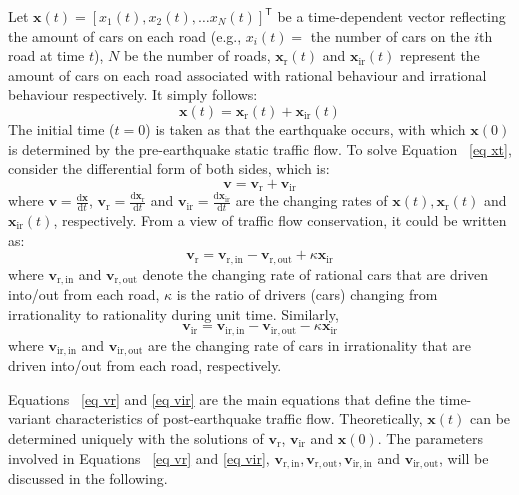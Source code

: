 \documentclass[review,11pt,nonatbib]{elsarticle}
\begin{document}
\par Let $\mathbf{x}(t) = [x_1(t),x_2(t),\ldots x_N(t)]^{\textsf{T}}$ be a time-dependent vector reflecting the amount of cars on each road (e.g., $x_i(t) = $ the number of cars on the $i$th road at time $t$),  $N$ be the number of roads, $\mathbf{x}_{\mathrm{r}}(t)$ and $\mathbf{x}_{\mathrm{ir}}(t)$ represent the amount of cars on each road associated with rational behaviour and irrational behaviour respectively. It simply follows:
\begin{equation}\label{eq xt}
\mathbf{x}(t)=\mathbf{x}_{\mathrm{r}}(t)+\mathbf{x}_{\mathrm{ir}}(t)
\end{equation}
The initial time ($t=0$) is taken as that the earthquake occurs, with which $\mathbf{x}(0)$ is determined by the pre-earthquake static traffic flow. To solve Equation ~\eqref{eq xt}, consider the differential form of both sides, which is:
\begin{equation}
\mathbf{v} = \mathbf{v}_{\mathrm{r}} + \mathbf{v}_{\mathrm{ir}}
\end{equation}
where $\mathbf{v} = \frac{\mathrm{d}\mathbf{x}}{\mathrm{d}t}$, $\mathbf{v}_{\mathrm{r}} = \frac{\mathrm{d}\mathbf{x}_{\mathrm{r}}}{\mathrm{d}t}$ and $ \mathbf{v}_{\mathrm{ir}} = \frac{\mathrm{d}\mathbf{x}_{\mathrm{ir}}}{\mathrm{d}t}$ are the changing rates of $\mathbf{x}(t), \mathbf{x}_{\mathrm{r}}(t)$ and $\mathbf{x}_{\mathrm{ir}}(t)$, respectively. From a view of traffic flow conservation, it could be written as:
\begin{equation}\label{eq vr}
\mathbf{v}_{\mathrm{r}}  = \mathbf{v}_{\mathrm{r,in}} - \mathbf{v}_{\mathrm{r,out}} + \kappa \mathbf{x}_{\mathrm{ir}}
\end{equation}
where $\mathbf{v}_{\mathrm{r,in}} $ and $\mathbf{v}_{\mathrm{r,out}}$ denote the changing rate of rational cars that are driven into/out from each road, $\kappa$ is the ratio of drivers (cars) changing from irrationality to rationality during unit time. Similarly,
\begin{equation}\label{eq vir}
\mathbf{v}_{\mathrm{ir}}  = \mathbf{v}_{\mathrm{ir,in}} - \mathbf{v}_{\mathrm{ir,out}} - \kappa \mathbf{x}_{\mathrm{ir}}
\end{equation}
where $\mathbf{v}_{\mathrm{ir,in}} $ and $\mathbf{v}_{\mathrm{ir,out}}$ are the changing rate of cars in irrationality that are driven into/out from each road, respectively.
\par Equations ~\eqref{eq vr} and \eqref{eq vir} are the main equations that define the time-variant characteristics of post-earthquake traffic flow. Theoretically, $\mathbf{x}(t)$ can be determined uniquely with the solutions of $\mathbf{v}_{\mathrm{r}}$, $\mathbf{v}_{\mathrm{ir}}$ and $\mathbf{x}(0)$. The parameters involved in Equations ~\eqref{eq vr} and \eqref{eq vir}, $\mathbf{v}_{\mathrm{r,in}}, \mathbf{v}_{\mathrm{r,out}},\mathbf{v}_{\mathrm{ir,in}}$ and $\mathbf{v}_{\mathrm{ir,out}}$, will be discussed in the following.
\end{document}
